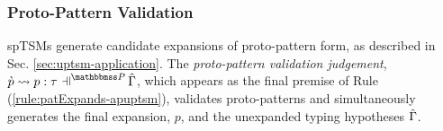 {{{{%


\subsubsection{Proto-Pattern Validation}
spTSMs generate candidate expansions of proto-pattern form, as described in Sec. \ref{sec:uptsm-application}. The \emph{proto-pattern validation judgement}, $\cvalidP{\upctx}{\pscenev}{\cpv}{p}{\tau}$, which appears as the final premise of Rule (\ref{rule:patExpands-apuptsm}), validates proto-patterns and simultaneously generates the final expansion, $p$, and the unexpanded typing hypotheses $\hat\Gamma$.

}}}}
